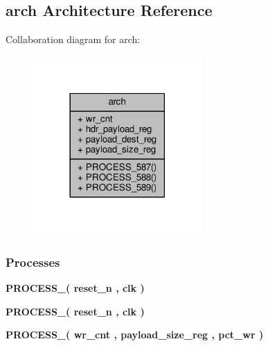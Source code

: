 \subsection{arch Architecture Reference}
\label{classpct__payload__extrct_1_1arch}


Collaboration diagram for arch\+:\nopagebreak
\begin{figure}[H]
\begin{center}
\leavevmode
\includegraphics[width=182pt]{d5/ded/classpct__payload__extrct_1_1arch__coll__graph}
\end{center}
\end{figure}
\subsubsection*{Processes}
 \begin{DoxyCompactItemize}
\item 
{\bf P\+R\+O\+C\+E\+S\+S\+\_}{\bfseries  ( {\bfseries {\bfseries {\bf reset\+\_\+n}} \textcolor{vhdlchar}{ }} , {\bfseries {\bfseries {\bf clk}} \textcolor{vhdlchar}{ }} )}
\item 
{\bf P\+R\+O\+C\+E\+S\+S\+\_}{\bfseries  ( {\bfseries {\bfseries {\bf reset\+\_\+n}} \textcolor{vhdlchar}{ }} , {\bfseries {\bfseries {\bf clk}} \textcolor{vhdlchar}{ }} )}
\item 
{\bf P\+R\+O\+C\+E\+S\+S\+\_}{\bfseries  ( {\bfseries {\bfseries {\bf wr\+\_\+cnt}} \textcolor{vhdlchar}{ }} , {\bfseries {\bfseries {\bf payload\+\_\+size\+\_\+reg}} \textcolor{vhdlchar}{ }} , {\bfseries {\bfseries {\bf pct\+\_\+wr}} \textcolor{vhdlchar}{ }} )}
\end{DoxyCompactItemize}
